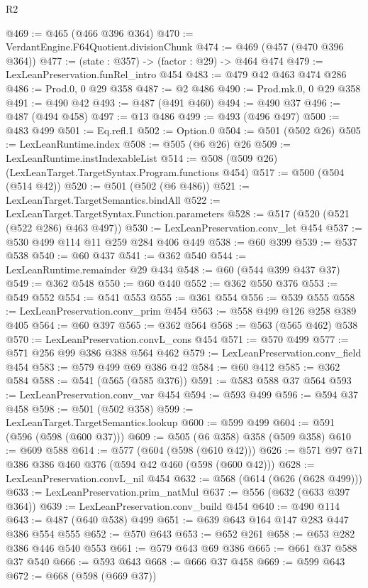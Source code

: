 \begin{lexlean}{R2}
\begin{coremodule}
@469 := @465 (@466 @396 @364)
@470 := VerdantEngine.F64Quotient.divisionChunk
@474 := @469 (@457 (@470 @396 @364))
@477 := (state : @357) -> (factor : @29) -> @464 @474
@479 := LexLeanPreservation.funRel_intro @454
@483 := @479 @42 @463 @474 @286
@486 := Prod.{0, 0} @29 @358
@487 := @2 @486
@490 := Prod.mk.{0, 0} @29 @358
@491 := @490 @42
@493 := @487 (@491 @460)
@494 := @490 @37
@496 := @487 (@494 @458)
@497 := @13 @486
@499 := @493 (@496 @497)
@500 := @483 @499
@501 := Eq.refl.{1}
@502 := Option.{0}
@504 := @501 (@502 @26)
@505 := LexLeanRuntime.index
@508 := @505 (@6 @26) @26
@509 := LexLeanRuntime.instIndexableList
@514 := @508 (@509 @26) (LexLeanTarget.TargetSyntax.Program.functions @454)
@517 := @500 (@504 (@514 @42))
@520 := @501 (@502 (@6 @486))
@521 := LexLeanTarget.TargetSemantics.bindAll
@522 := LexLeanTarget.TargetSyntax.Function.parameters
@528 := @517 (@520 (@521 (@522 @286) @463 @497))
@530 := LexLeanPreservation.conv_let @454
@537 := @530 @499 @114 @11 @259 @284 @406 @449
@538 := @60 @399
@539 := @537 @538
@540 := @60 @437
@541 := @362 @540
@544 := LexLeanRuntime.remainder @29 @434
@548 := @60 (@544 @399 @437 @37)
@549 := @362 @548
@550 := @60 @440
@552 := @362 @550 @376
@553 := @549 @552
@554 := @541 @553
@555 := @361 @554
@556 := @539 @555
@558 := LexLeanPreservation.conv_prim @454
@563 := @558 @499 @126 @258 @389 @405
@564 := @60 @397
@565 := @362 @564
@568 := @563 (@565 @462) @538
@570 := LexLeanPreservation.convL_cons @454
@571 := @570 @499
@577 := @571 @256 @99 @386 @388 @564 @462
@579 := LexLeanPreservation.conv_field @454
@583 := @579 @499 @69 @386 @42
@584 := @60 @412
@585 := @362 @584
@588 := @541 (@565 (@585 @376))
@591 := @583 @588 @37 @564
@593 := LexLeanPreservation.conv_var @454
@594 := @593 @499
@596 := @594 @37 @458
@598 := @501 (@502 @358)
@599 := LexLeanTarget.TargetSemantics.lookup
@600 := @599 @499
@604 := @591 (@596 (@598 (@600 @37)))
@609 := @505 (@6 @358) @358 (@509 @358)
@610 := @609 @588
@614 := @577 (@604 (@598 (@610 @42)))
@626 := @571 @97 @71 @386 @386 @460 @376 (@594 @42 @460 (@598 (@600 @42)))
@628 := LexLeanPreservation.convL_nil @454
@632 := @568 (@614 (@626 (@628 @499)))
@633 := LexLeanPreservation.prim_natMul
@637 := @556 (@632 (@633 @397 @364))
@639 := LexLeanPreservation.conv_build @454
@640 := @490 @114
@643 := @487 (@640 @538) @499
@651 := @639 @643 @164 @147 @283 @447 @386 @554 @555
@652 := @570 @643
@653 := @652 @261
@658 := @653 @282 @386 @446 @540 @553
@661 := @579 @643 @69 @386
@665 := @661 @37 @588 @37 @540
@666 := @593 @643
@668 := @666 @37 @458
@669 := @599 @643
@672 := @668 (@598 (@669 @37))

\end{coremodule}
\end{lexlean}
